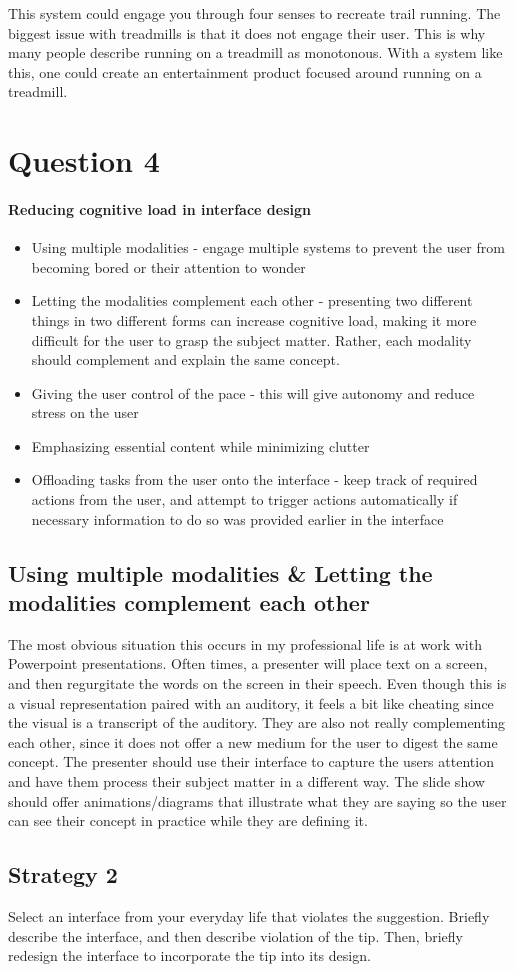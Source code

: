 This system could engage you through four senses to recreate trail running. The biggest issue with treadmills is that it does not engage their user. This is why many people describe running on a treadmill as monotonous. With a system like this, one could create an entertainment product focused around running on a treadmill.

\section{Question 4}

\paragraph{Reducing cognitive load in interface design}
\begin{itemize}
\item
  Using multiple modalities - engage multiple systems to prevent the user from becoming bored or their attention to wonder
\item
  Letting the modalities complement each other - presenting two different things in two different forms can increase cognitive load, making it more difficult for the user to grasp the subject matter. Rather, each modality should complement and explain the same concept.
\item
  Giving the user control of the pace - this will give autonomy and reduce stress on the user
\item
  Emphasizing essential content while minimizing clutter
\item
  Offloading tasks from the user onto the interface - keep track of required actions from the user, and attempt to trigger actions automatically if necessary information to do so was provided earlier in the interface
\end{itemize}

\subsection{Using multiple modalities & Letting the modalities complement each other}
The most obvious situation this occurs in my professional life is at work with Powerpoint presentations. Often times, a presenter will place text on a screen, and then regurgitate the words on the screen in their speech. Even though this is a visual representation paired with an auditory, it feels a bit like cheating since the visual is a transcript of the auditory. They are also not really complementing each other, since it does not offer a new medium for the user to digest the same concept. The presenter should use their interface to capture the users attention and have them process their subject matter in a different way. The slide show should offer animations/diagrams that illustrate what they are saying so the user can see their concept in practice while they are defining it.

\subsection{Strategy 2}

Select an interface from your everyday life that violates the suggestion. Briefly describe the interface, and then describe violation of the tip. Then, briefly redesign the interface to incorporate the tip into its design.


